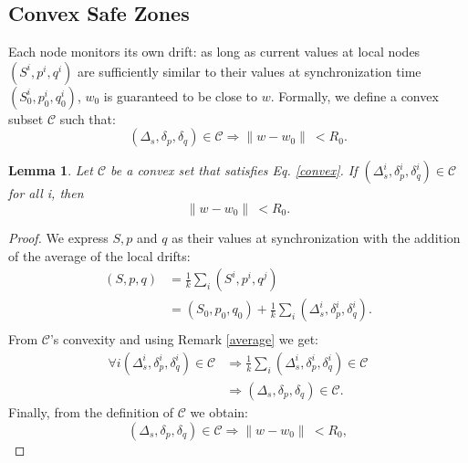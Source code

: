 \documentclass{sig-alternate-05-2015}
\newtheorem{lemma}{Lemma}
\begin{document}
\subsection{Convex Safe Zones}
Each node monitors its own drift: as long as current values
at local nodes $(S^i,p^i,q^i)$ are sufficiently similar to their values
at synchronization time $(S^i_0,p^i_0,q^i_0)$, $w_0$ is guaranteed to be close to $w$.
Formally, we define a convex subset $\mathcal{C}$ such that:
\begin{equation} \label{convex}
(\Delta_s, \delta_p, \delta_q) \in \mathcal{C} \Rightarrow \parallel w-w_0
\parallel \ < R_0.
\end{equation}
\begin{lemma}
Let $\mathcal{C}$ be a convex set that satisfies Eq. \ref{convex}.
If $(\Delta_s^i, \delta_p^i, \delta_q^i) \in \mathcal{C}$ for all i, then
\begin{equation*}
\parallel w-w_0 \parallel \ < R_0.
\end{equation*}
\end{lemma}
\begin{proof}
We express $S, p$ and $q$ as their values at synchronization with the addition of the
average of the local drifts:
\begin{equation*}
\begin{split}
(S,p,q) & = \frac{1}{k} \sum_i (S^i,p^i,q^j) \\
 & = (S_0,p_0,q_0) + \frac{1}{k} \sum_i (\Delta_s^i,\delta^i_p,\delta_q^i). \\
\end{split}
\end{equation*}
From $\mathcal{C}$'s convexity and using Remark \ref{average} we get:
\begin{equation*}
\begin{split}
\forall i (\Delta_s^i,\delta^i_p,\delta_q^i) \in \mathcal{C} & \Rightarrow
\frac{1}{k} \sum_i (\Delta_s^i,\delta^i_p,\delta_q^i) \in \mathcal{C} \\
& \Rightarrow (\Delta_s,\delta_p,\delta_q) \in \mathcal{C}.
\end{split}
\end{equation*}
Finally, from the definition of $\mathcal{C}$ we obtain:
\begin{equation*}
(\Delta_s,\delta_p,\delta_q) \in \mathcal{C} \Rightarrow \parallel w-w_0
\parallel \ < R_0,
\end{equation*}
\end{proof}
\end{document}
